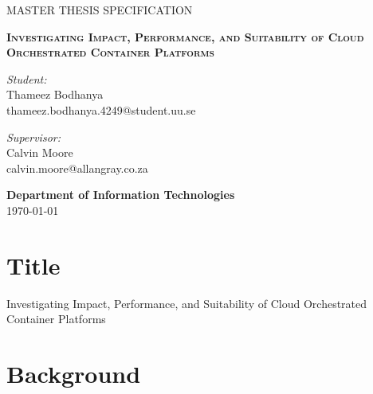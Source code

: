 \documentclass[12pt]{article}
\begin{document}
\begin{titlepage}
\thispagestyle{fancy}

\vspace{1in}

\center

\textsc{\large MASTER THESIS SPECIFICATION}

\vspace{0.5in}

\noindent\makebox[\linewidth]{\rule{\linewidth}{1.2pt}}
\textsc{ \textbf{\large Investigating Impact, Performance, and Suitability of Cloud Orchestrated Container Platforms}}
\noindent\makebox[\linewidth]{\rule{\linewidth}{1.2pt}}

\vspace{0.5in}

\begin{minipage}{0.48\textwidth}
    \begin{flushleft}
        \textit{Student:} \\
        Thameez Bodhanya \\
        thameez.bodhanya.4249@student.uu.se
    \end{flushleft}
\end{minipage}
\begin{minipage}{0.48\textwidth}
    \begin{flushright}
    \textit{Supervisor:} \\
    Calvin Moore \\
    calvin.moore@allangray.co.za
    \end{flushright}
\end{minipage}

\vspace{2in}

\textbf{\large Department of Information Technologies} \\

\today

\end{titlepage}

\newpage

\setcounter{page}{2}
\tableofcontents
\newpage

\section{Title}
 Investigating Impact, Performance, and Suitability of Cloud Orchestrated Container Platforms

\section{Background}
\end{document}
